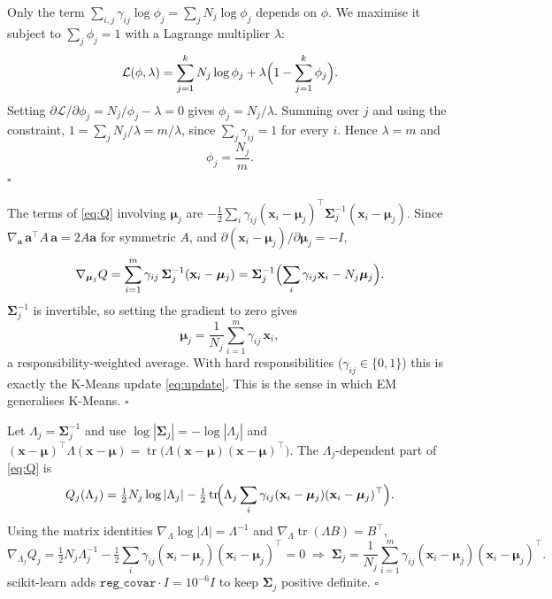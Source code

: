 \documentclass[11pt,a4paper]{article}
\newcommand{\x}{\mathbf{x}}
\newcommand{\vmu}{\boldsymbol{\mu}}
\newcommand{\vSigma}{\boldsymbol{\Sigma}}
\DeclareMathOperator{\tr}{tr}
\begin{document}
\begin{proofbox}
Only the term $\sum_{i,j}\gamma_{ij}\log\phi_j=\sum_j N_j\log\phi_j$ depends on $\phi$. We maximise it subject to
$\sum_j\phi_j=1$ with a Lagrange multiplier $\lambda$:
\begin{equation*}
  \mathcal{L}(\phi,\lambda)=\sum_{j=1}^{k}N_j\log\phi_j+\lambda\Bigl(1-\sum_{j=1}^{k}\phi_j\Bigr).
\end{equation*}
Setting $\partial\mathcal{L}/\partial\phi_j=N_j/\phi_j-\lambda=0$ gives $\phi_j=N_j/\lambda$. Summing over $j$ and
using the constraint, $1=\sum_j N_j/\lambda=m/\lambda$, since $\sum_j\gamma_{ij}=1$ for every $i$. Hence
$\lambda=m$ and
\begin{equation*}
  \phi_j=\frac{N_j}{m}.
\end{equation*}
\hfill$\square$
\end{proofbox}

\begin{proofbox}
The terms of \eqref{eq:Q} involving $\vmu_j$ are $-\tfrac12\sum_i\gamma_{ij}(\x_i-\vmu_j)^\top\vSigma_j^{-1}(\x_i-\vmu_j)$.
Since $\nabla_{\mathbf{a}}\,\mathbf{a}^\top A\,\mathbf{a}=2A\mathbf{a}$ for symmetric $A$, and
$\partial(\x_i-\vmu_j)/\partial\vmu_j=-I$,
\begin{equation*}
  \nabla_{\vmu_j}Q=\sum_{i=1}^{m}\gamma_{ij}\,\vSigma_j^{-1}(\x_i-\vmu_j)
  =\vSigma_j^{-1}\Bigl(\sum_{i}\gamma_{ij}\x_i-N_j\vmu_j\Bigr).
\end{equation*}
$\vSigma_j^{-1}$ is invertible, so setting the gradient to zero gives
\begin{equation*}
  \vmu_j=\frac{1}{N_j}\sum_{i=1}^{m}\gamma_{ij}\,\x_i ,
\end{equation*}
a responsibility-weighted average. With hard responsibilities ($\gamma_{ij}\in\{0,1\}$) this is exactly the
K-Means update \eqref{eq:update}. This is the sense in which EM generalises K-Means. \hfill$\square$
\end{proofbox}

\begin{proofbox}
Let $\Lambda_j=\vSigma_j^{-1}$ and use $\log|\vSigma_j|=-\log|\Lambda_j|$ and
$(\x-\vmu)^\top\Lambda(\x-\vmu)=\tr\!\bigl(\Lambda(\x-\vmu)(\x-\vmu)^\top\bigr)$. The $\Lambda_j$-dependent part
of \eqref{eq:Q} is
\begin{equation*}
  Q_j(\Lambda_j)=\tfrac12 N_j\log|\Lambda_j|-\tfrac12\tr\!\Bigl(\Lambda_j\sum_i\gamma_{ij}(\x_i-\vmu_j)(\x_i-\vmu_j)^\top\Bigr).
\end{equation*}
Using the matrix identities $\nabla_\Lambda\log|\Lambda|=\Lambda^{-1}$ and $\nabla_\Lambda\tr(\Lambda B)=B^\top$,
\begin{equation*}
  \nabla_{\Lambda_j}Q_j=\tfrac12N_j\Lambda_j^{-1}-\tfrac12\sum_i\gamma_{ij}(\x_i-\vmu_j)(\x_i-\vmu_j)^\top=0
  \;\Longrightarrow\;
  \vSigma_j=\frac{1}{N_j}\sum_{i=1}^{m}\gamma_{ij}(\x_i-\vmu_j)(\x_i-\vmu_j)^\top .
\end{equation*}
scikit-learn adds $\texttt{reg\_covar}\cdot I=10^{-6}I$ to keep $\vSigma_j$ positive definite. \hfill$\square$
\end{proofbox}
\end{document}
